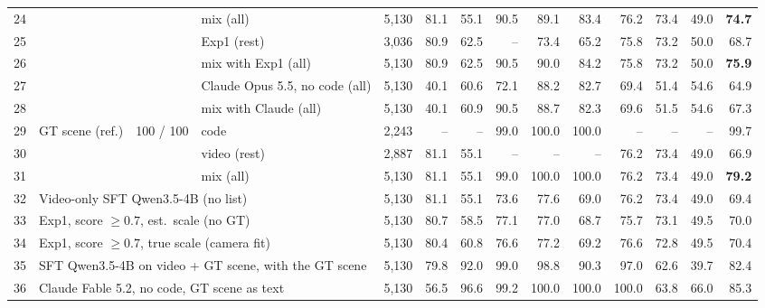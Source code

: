\begin{table}[h]
{\begin{tabular}{rlrlrrrrrrrrrr}
24 &  &  & mix (all) & 5,130 & 81.1 & 55.1 & 90.5 & 89.1 & 83.4 & 76.2 & 73.4 & 49.0 & \textbf{74.7} \\
\cmidrule(lr){4-14}
25 &  &  & Exp1 (rest) & 3,036 & 80.9 & 62.5 & -- & 73.4 & 65.2 & 75.8 & 73.2 & 50.0 & 68.7 \\
26 &  &  & mix with Exp1 (all) & 5,130 & 80.9 & 62.5 & 90.5 & 90.0 & 84.2 & 75.8 & 73.2 & 50.0 & \textbf{75.9} \\
\cmidrule(lr){4-14}
27 &  &  & Claude Opus 5.5, no code (all) & 5,130 & 40.1 & 60.6 & 72.1 & 88.2 & 82.7 & 69.4 & 51.4 & 54.6 & 64.9 \\
28 &  &  & mix with Claude (all) & 5,130 & 40.1 & 60.9 & 90.5 & 88.7 & 82.3 & 69.6 & 51.5 & 54.6 & 67.3 \\
\midrule
29 & GT scene (ref.) & 100 / 100 & code & 2,243 & -- & -- & 99.0 & 100.0 & 100.0 & -- & -- & -- & 99.7 \\
30 &  &  & video (rest) & 2,887 & 81.1 & 55.1 & -- & -- & -- & 76.2 & 73.4 & 49.0 & 66.9 \\
31 &  &  & mix (all) & 5,130 & 81.1 & 55.1 & 99.0 & 100.0 & 100.0 & 76.2 & 73.4 & 49.0 & \textbf{79.2} \\
\midrule
32 & \multicolumn{3}{l}{Video-only SFT Qwen3.5-4B (no list)} & 5,130 & 81.1 & 55.1 & 73.6 & 77.6 & 69.0 & 76.2 & 73.4 & 49.0 & 69.4 \\
33 & \multicolumn{3}{l}{Exp1, score $\geq 0.7$, est.\ scale (no GT)} & 5,130 & 80.7 & 58.5 & 77.1 & 77.0 & 68.7 & 75.7 & 73.1 & 49.5 & 70.0 \\
34 & \multicolumn{3}{l}{Exp1, score $\geq 0.7$, true scale (camera fit)} & 5,130 & 80.4 & 60.8 & 76.6 & 77.2 & 69.2 & 76.6 & 72.8 & 49.5 & 70.4 \\
35 & \multicolumn{3}{l}{SFT Qwen3.5-4B on video + GT scene, with the GT scene} & 5,130 & 79.8 & 92.0 & 99.0 & 98.8 & 90.3 & 97.0 & 62.6 & 39.7 & 82.4 \\
36 & \multicolumn{3}{l}{Claude Fable 5.2, no code, GT scene as text} & 5,130 & 56.5 & 96.6 & 99.2 & 100.0 & 100.0 & 100.0 & 63.8 & 66.0 & 85.3 \\
\bottomrule
\end{tabular}}
\end{table}

